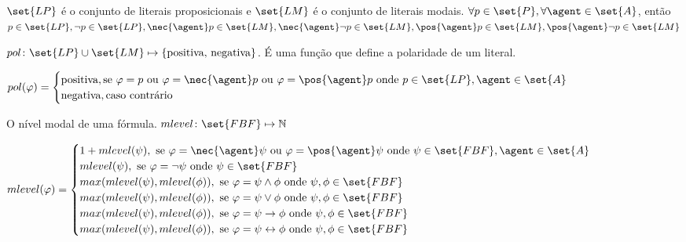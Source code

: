 
\begin{definition}
$\set{LP}$ é o conjunto de literais proposicionais e $\set{LM}$ é o conjunto de literais modais.
$\forall p \in \set{P}, \forall \agent \in \set{A}$, então $ p \in \set{LP}, \neg p \in \set{LP}, \nec{\agent} p \in \set{LM}, \nec{\agent} \neg p \in \set{LM}, \pos{\agent} p \in \set{LM}, \pos{\agent} \neg p \in \set{LM}$
\end{definition}

\begin{definition}
$pol \colon \set{LP} \cup \set{LM} \mapsto \{\text{positiva, negativa}\}$. É uma função que define a polaridade de um literal.

$pol(\varphi)=
\begin{cases}
\text{positiva},\text{se } \varphi = p \text{ ou } \varphi = \nec{\agent} p \text{ ou } \varphi = \pos{\agent} p \text{ onde } p \in \set{LP}, \agent \in \set{A}\\
\text{negativa},\text{caso contrário}\\
\end{cases}$
\end{definition}

\begin{definition}
O nível modal de uma fórmula. $mlevel \colon \set{FBF} \mapsto \mathbb{N}$

$mlevel(\varphi)=
\begin{cases}
1 + mlevel(\psi),\text{ se } \varphi = \nec{\agent} \psi \text{ ou } \varphi = \pos{\agent} \psi \text{ onde } \psi \in \set{FBF}, \agent \in \set{A}\\
mlevel(\psi),\text{ se } \varphi = \neg\psi \text{ onde } \psi \in \set{FBF}\\
max(mlevel(\psi), mlevel(\phi)),\text{ se } \varphi = \psi \land \phi \text{ onde } \psi, \phi \in \set{FBF}\\
max(mlevel(\psi), mlevel(\phi)),\text{ se } \varphi = \psi \lor \phi \text{ onde } \psi, \phi \in \set{FBF}\\
max(mlevel(\psi), mlevel(\phi)),\text{ se } \varphi = \psi \rightarrow \phi \text{ onde } \psi, \phi \in \set{FBF}\\
max(mlevel(\psi), mlevel(\phi)),\text{ se } \varphi = \psi \leftrightarrow \phi \text{ onde } \psi, \phi \in \set{FBF}\\
\end{cases}$
\end{definition}



